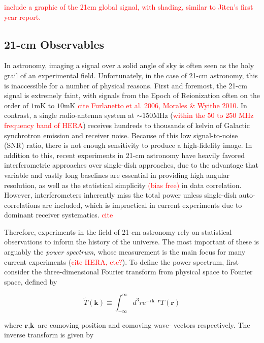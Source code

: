 \documentclass[floats,floatfix,showpacs,amssymb,prd,superscriptaddress,nofootinbib]{revtex4-2} %
\newcommand{\red}{\textcolor{red}}
\begin{document}
\red{include a graphic of the 21cm global signal, with shading, similar to Jiten's first year report.}

\subsection{21-cm Observables}

In astronomy, imaging a signal over a solid angle of sky is often seen as the holy grail of an experimental field. Unfortunately, in the case of 21-cm astronomy, this is inaccessible for a number of physical reasons. First and foremost, the 21-cm signal is extremely faint, with signals from the Epoch of Reionization often on the order of $1 \text{mK}$ to $10 \text{mK}$ \red{cite Furlanetto et al. 2006, Morales \& Wyithe 2010}. In contrast, a single radio-antenna system at  $\sim 150 \text{MHz}$ (\red{within the 50 to 250 MHz frequency band of HERA}) receives hundreds to thousands of kelvin of Galactic synchrotron emission and receiver noise. Because of this low signal-to-noise (SNR) ratio, there is not enough sensitivity to produce a high-fidelity image. In addition to this, recent experiments in 21-cm astronomy have heavily favored interferometric approaches over single-dish approaches, due to the advantage that variable and vastly long baselines are essential in providing high angular resolution, as well as the statistical simplicity \red{(bias free)} in data correlation. However, interferometers inherently miss the total power unless single-dish auto-correlations are included, which is impractical in current experiments due to dominant receiver systematics. \red{cite}

Therefore, experiments in the field of 21-cm astronomy rely on statistical observations to inform the history of the universe. The most important of these is arguably the \textit{power spectrum}, whose measurement is the main focus for many current experiments (\red{cite HERA, etc?}). To define the power spectrum, first consider the three-dimensional Fourier transform from physical space to Fourier space, defined by

\begin{equation}
    \tilde{T} (\textbf{k}) \equiv \int^\infty _{-\infty} d^3 r e^{-i\textbf{k} \cdot \textbf{r}} T(\textbf{r})
\end{equation}

\noindent where $\textbf{r}, \textbf{k}$ are comoving position and comoving wave- vectors respectively. The inverse transform is given by 
\end{document}

